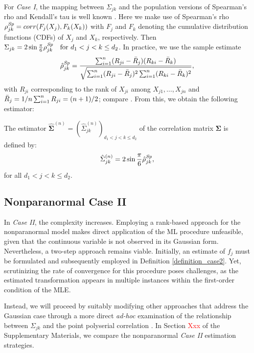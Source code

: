 For \textit{Case I}, the mapping between $\Sigma_{jk}$ and the population versions of Spearman's rho and Kendall's tau is well known \citep{Liu09}. Here we make use of Spearman's rho $\rho^{\text{\textit{Sp}}}_{jk} = corr(F_j(X_j),F_k(X_k))$ with $F_j$ and $F_k$ denoting the cumulative distribution functions (CDFs) of $X_j$ and $X_k$, respectively. Then $\Sigma_{jk} = 2\sin{\frac{\pi}{6} \rho^{\text{\textit{Sp}}}_{jk}} \quad \text{for } d_1  < j < k \leq d_2$. In practice, we use the sample estimate
\begin{equation*}
    \hat{\rho}^{\text{\textit{Sp}}}_{jk} = \frac{\sum_{i=1}^n (R_{ji} - \Bar{R}_{j}) (R_{ki} - \Bar{R}_{k})}{\sqrt{\sum_{i=1}^n(R_{ji} - \Bar{R}_{j})^2\sum_{i=1}^n(R_{ki} - \Bar{R}_{k})^2}},
\end{equation*}
with $R_{ji}$ corresponding to the rank of $X_{ji}$ among $X_{j1}, \dots, X_{jn}$ and $\Bar{R}_{j} = 1/n \sum_{i=1}^n R_{ji} = (n+1)/2$; compare \cite{Liu12}. From this, we obtain the following estimator:
\begin{definition}\label{case1_nonpara}
    The estimator $\hat{\mathbf{\Sigma}}^{(n)} = (\hat{\Sigma}_{jk}^{(n)})_{d_1 < j< k\leq d_2}$ of the correlation matrix $\mathbf{\Sigma}$ is defined by:
    \begin{equation}
            \hat{\Sigma}_{jk}^{(n)} = 2\sin{\frac{\pi}{6} \hat{\rho}^{\text{\textit{Sp}}}_{jk}},
    \end{equation}
    for all $d_1 < j < k \leq d_2$.
\end{definition}

\subsection{Nonparanormal Case II}\label{sec::nonparanormal_case2}

In \textit{Case II}, the complexity increases. Employing a rank-based approach for the nonparanormal model makes direct application of the ML procedure unfeasible, given that the continuous variable is not observed in its Gaussian form. Nevertheless, a two-step approach remains viable. Initially, an estimate of \(f_j\) must be formulated and subsequently employed in Definition \ref{definition_case2}. Yet, scrutinizing the rate of convergence for this procedure poses challenges, as the estimated transformation appears in multiple instances within the first-order condition of the MLE.

Instead, we will proceed by suitably modifying other approaches that address the Gaussian case through a more direct \textit{ad-hoc} examination of the relationship between $\Sigma_{jk}$ and the point polyserial correlation \citep{Bedrick92, Bedrick96}.
In Section \textcolor{red}{Xxx} of the Supplementary Materials, we compare the nonparanormal \textit{Case II} estimation strategies.

